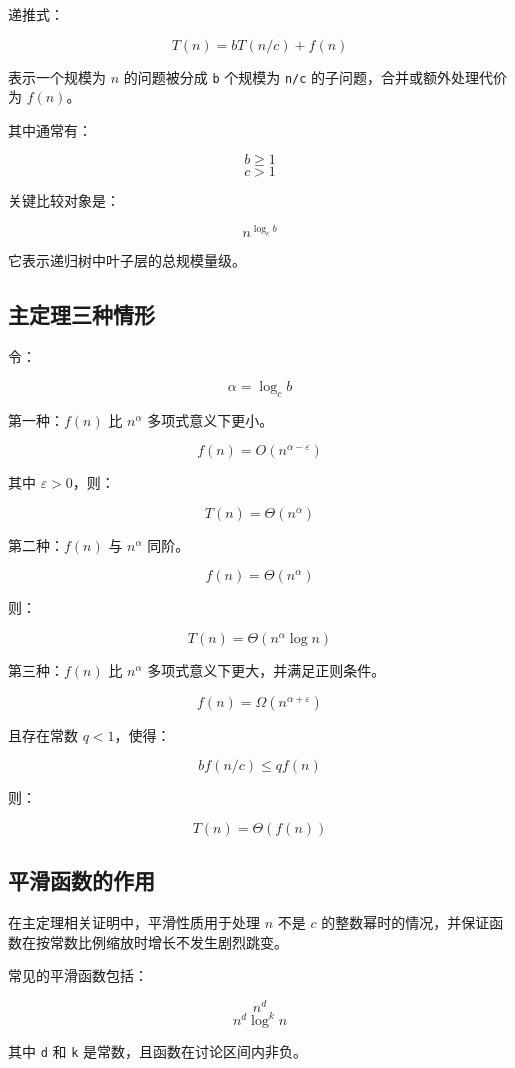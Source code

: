 \documentclass[UTF8,zihao=-4]{ctexart}
\begin{document}
递推式：

\[T(n) = bT(n/c) + f(n)\]

表示一个规模为 $n$ 的问题被分成 \texttt{b} 个规模为 \texttt{n/c} 的子问题，合并或额外处理代价为 $f(n)$。

其中通常有：

\[b \ge  1\]
\[c > 1\]

关键比较对象是：

\[n^{\log_c b}\]

它表示递归树中叶子层的总规模量级。

\subsection*{主定理三种情形}

令：

\[\alpha = \log_c b\]

第一种：$f(n)$ 比 $n^\alpha$ 多项式意义下更小。

\[f(n) = O(n^{\alpha - \varepsilon})\]

其中 $\varepsilon > 0$，则：

\[T(n) = \Theta(n^\alpha)\]

第二种：$f(n)$ 与 $n^\alpha$ 同阶。

\[f(n) = \Theta(n^\alpha)\]

则：

\[T(n) = \Theta(n^\alpha \log n)\]

第三种：$f(n)$ 比 $n^\alpha$ 多项式意义下更大，并满足正则条件。

\[f(n) = \Omega(n^{\alpha + \varepsilon})\]

且存在常数 $q < 1$，使得：

\[b f(n/c) \le  q f(n)\]

则：

\[T(n) = \Theta(f(n))\]

\subsection*{平滑函数的作用}

在主定理相关证明中，平滑性质用于处理 $n$ 不是 $c$ 的整数幂时的情况，并保证函数在按常数比例缩放时增长不发生剧烈跳变。

常见的平滑函数包括：

\[n^{d}\]
\[n^{d} \log^{k} n\]

其中 \texttt{d} 和 \texttt{k} 是常数，且函数在讨论区间内非负。
\end{document}
